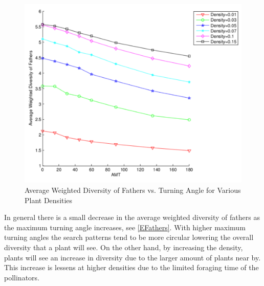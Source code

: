 \begin{figure}
  \begin{center}
  \includegraphics[scale=0.5]{WDFvsAMT.pdf}
  \end{center}
  \caption{\small Average Weighted Diversity of Fathers vs. Turning Angle for Various Plant Densities}
  \label{EFathers}
\end{figure}

In general there is a small decrease in the average weighted diversity of
fathers as the maximum turning angle increases, see \autoref{EFathers}. With
higher maximum turning angles the search patterns tend to be more circular
lowering the overall diversity that a plant will see.  On the other hand, by
increasing the density, plants will see an increase in diversity due to the
larger amount of plants near by.  This increase is lessens at higher densities
due to the limited foraging time of the pollinators.
